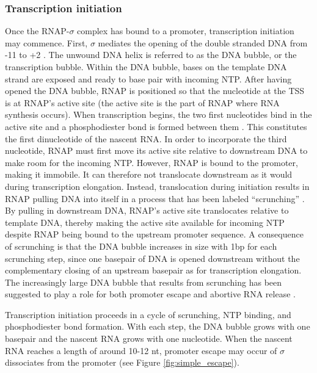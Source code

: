 \subsubsection{Transcription initiation}
Once the RNAP-$\sigma$ complex has bound to a promoter, transcription
initiation may commence. First, $\sigma$ mediates the opening of the double
stranded DNA from -11 to +2 \cite{borukhov_rna_2008}. The unwound DNA helix is
referred to as the DNA bubble, or the transcription bubble. Within the DNA
bubble, bases on the template DNA strand are exposed and ready to base pair
with incoming NTP. After having opened the DNA bubble, RNAP is positioned so that the
nucleotide at the TSS is at RNAP's active site (the active site is the part of
RNAP where RNA synthesis occurs). When transcription begins, the two first
nucleotides bind in the active site and a phosphodiester bond is formed between
them \cite{mcclure_steady_1978}. This constitutes the first dinucleotide of
the nascent RNA. In order to incorporate the third nucleotide, RNAP must first
move its active site relative to downstream DNA to make room for the incoming
NTP. However, RNAP is bound to the promoter, making it immobile. It can
therefore not translocate downstream as it would during transcription
elongation. Instead, translocation during initiation results in RNAP pulling
DNA into itself in a process that has been labeled ``scrunching''
\cite{kapanidis_initial_2006, revyakin_abortive_2006}.  By pulling in
downstream DNA, RNAP's active site translocates relative to template DNA,
thereby making the active site available for incoming NTP despite RNAP being
bound to the upstream promoter sequence. A consequence of scrunching is that
the DNA bubble increases in size with 1bp for each scrunching step, since one
basepair of DNA is opened downstream without the complementary closing of an
upstream basepair as for transcription elongation. The increasingly large DNA
bubble that results from scrunching has been suggested to play a role for both
promoter escape and abortive RNA release \cite{lilian_m_promoter_2002,
kapanidis_initial_2006}.

Transcription initiation proceeds in a cycle of scrunching, NTP binding, and
phosphodiester bond formation. With each step, the DNA bubble grows with one
basepair and the nascent RNA grows with one nucleotide. When the nascent RNA
reaches a length of around 10-12 nt, promoter escape may occur of $\sigma$
dissociates from the promoter \cite{lilian_m_promoter_2002} (see
Figure \ref{fig:simple_escape}).


